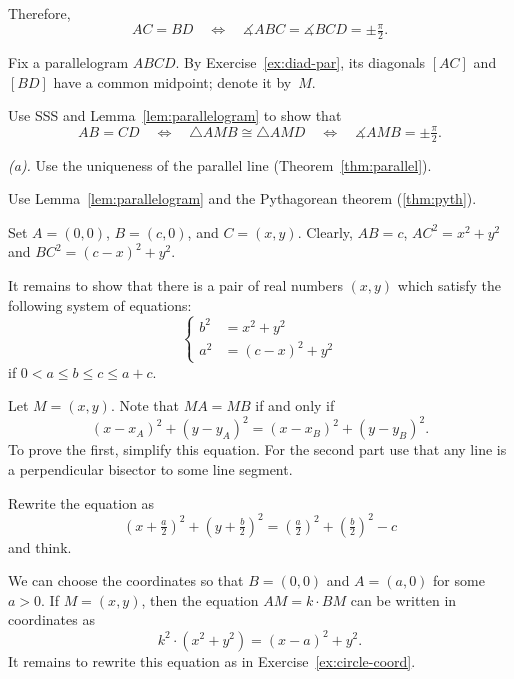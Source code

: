Therefore, 
\[AC=BD
\quad
\iff
\quad 
\measuredangle ABC
=\measuredangle BCD
=\pm\tfrac\pi2.\]

Fix a parallelogram $ABCD$.
By Exercise~\ref{ex:diad-par},
its diagonals $[AC]$ and $[BD]$ have a common midpoint; denote it by~$M$.

Use SSS and Lemma~\ref{lem:parallelogram} to show that
\[AB=CD
\quad
\iff
\quad
\triangle AMB
\cong
\triangle AMD
\quad
\iff
\quad
\measuredangle AMB
=
\pm\tfrac\pi2.\]

 \textit{(a).} Use the uniqueness of the parallel line (Theorem~\ref{thm:parallel}).

 Use Lemma~\ref{lem:parallelogram} and the Pythagorean theorem (\ref{thm:pyth}).

Set $A=(0,0)$, $B=(c,0)$, and $C=(x,y)$.
Clearly, $AB=c$,
$AC^2=x^2+y^2$ and $BC^2=(c-x)^2+y^2$.

It remains to show that there is a pair of real numbers $(x,y)$ 
which satisfy the following system of equations:
$$
\left\{
\begin{aligned}
b^2&=x^2+y^2
\\
a^2&=(c-x)^2+y^2
\end{aligned}
\right.
$$
if $0<a\le b\le c\le a+c$.




 Let $M=(x,y)$. Note that $MA=MB$ if and only if
\[(x-x_A)^2+(y-y_A)^2=(x-x_B)^2+(y-y_B)^2.\]
To prove the first, simplify this equation.
For the second part use that any line is a perpendicular bisector to some line segment.

 Rewrite the equation as 
\[(x+\tfrac a2)^2+(y+\tfrac b2)^2=(\tfrac a2)^2+(\tfrac b2)^2-c\]
and think.

We can choose the coordinates so that $B=(0,0)$ and $A=(a,0)$ for some $a>0$.
If $M=(x,y)$, then the equation $AM=k\cdot BM$ can be written in coordinates as 
\[k^2\cdot(x^2+y^2)=(x-a)^2+y^2.\]
It remains to rewrite this equation as in Exercise~\ref{ex:circle-coord}.


\setcounter{eqtn}{0}

